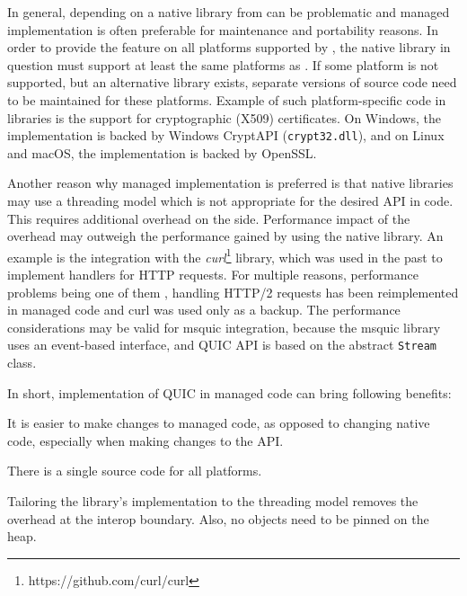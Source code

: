 In general, depending on a native library from \dotnet{} can be problematic and managed
implementation is often preferable for maintenance and portability reasons. In order to provide the
feature on all platforms supported by \dotnet{}, the native library in question must support at
least the same platforms as \dotnet{}. If some platform is not supported, but an alternative library
exists, separate versions of \dotnet{} source code need to be maintained for these platforms.
Example of such platform-specific code in \dotnet{} libraries is the support for cryptographic
(X509) certificates. On Windows, the implementation is backed by Windows CryptAPI (\texttt{crypt32.dll}), and
on Linux and macOS, the implementation is backed by OpenSSL\@. 




Another reason why managed implementation is preferred is that native libraries may use a threading
model which is not appropriate for the desired API in \dotnet{} code. This requires additional
overhead on the \dotnet{} side. Performance impact of the overhead may outweigh the performance
gained by using the native library.  An example is the
integration with the \textit{curl}\footnote{https://github.com/curl/curl} library, which was used
in the past to implement handlers for HTTP requests. For multiple reasons, performance problems
being one of them , handling HTTP/2 requests has been
reimplemented in managed code and curl was used only as a backup. The performance considerations may
be valid for msquic integration, because the msquic library uses an event-based interface, and
\dotnet{} QUIC API is based on the abstract \texttt{Stream} class.

In short, implementation of QUIC in managed \dotnet{} code can bring following benefits:

\begin{itemize}
    It is easier to make changes to managed code, as opposed to changing native code, especially
    when making changes to the API\@.

    There is a single source code for all platforms.

    Tailoring the library's implementation to the \dotnet{} threading model removes the overhead at
    the interop boundary. Also, no objects need to be pinned on the heap.
\end{itemize}

